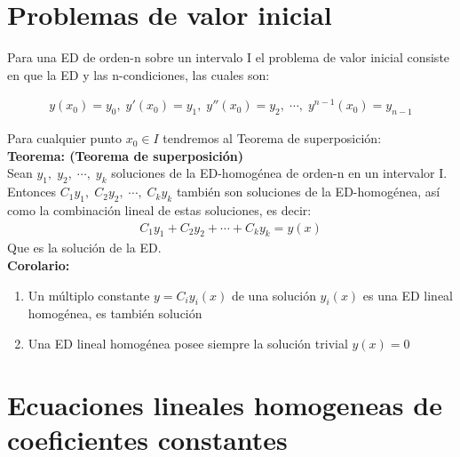 \clearpage

\section{Problemas de valor inicial}

Para una ED de orden-n sobre un intervalo I el problema de valor inicial consiste en que la ED y las n-condiciones, las cuales son:

\begin{equation*}
    \begin{gathered}
        y(x_{0})=y_{0},\;y'(x_{0})=y_{1},\;y''(x_{0})=y_{2},\;\cdots,\;y^{n-1}(x_{0})=y_{n-1}
    \end{gathered}
\end{equation*}

Para cualquier punto \(\displaystyle x_{0}\in I\) tendremos al Teorema de superposición:\\

\textbf{Teorema: (Teorema de superposición)}\\

Sean \(\displaystyle y_{1},\;y_{2},\;\cdots,\;y_{k}\) soluciones de la ED-homogénea de orden-n en un intervalor I.\\

Entonces \(\displaystyle C_{1}y_{1},\;C_{2}y_{2},\;\cdots,\;C_{k}y_{k}\) también son soluciones de la ED-homogénea, así como la combinación lineal de estas soluciones, es decir:
\begin{equation*}
    \begin{gathered}
        C_{1}y_{1}+C_{2}y_{2}+\cdots+C_{k}y_{k}=y(x)
    \end{gathered}
\end{equation*} Que es la solución de la ED.\\

\textbf{Corolario:}

\begin{enumerate}
  \item Un múltiplo constante \(\displaystyle y=C_{i}y_{i}(x)\) de una solución \(\displaystyle y_{i}(x)\) es una ED lineal homogénea, es también solución
  \item Una ED lineal homogénea posee siempre la solución trivial \(\displaystyle y(x)=0\)
\end{enumerate}

\section{Ecuaciones lineales homogeneas de coeficientes constantes}

